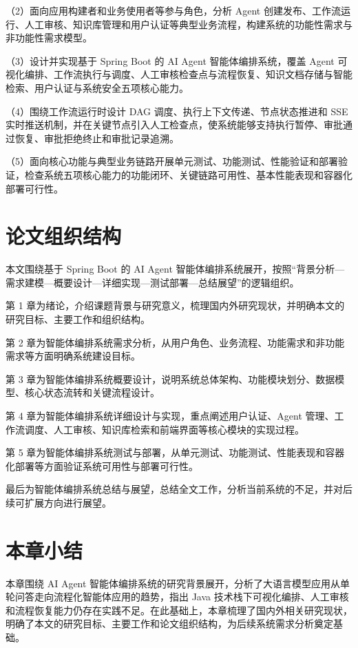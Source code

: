 （2）面向应用构建者和业务使用者等参与角色，分析 Agent 创建发布、工作流运行、人工审核、知识库管理和用户认证等典型业务流程，构建系统的功能性需求与非功能性需求模型。

（3）设计并实现基于 Spring Boot 的 AI Agent 智能体编排系统，覆盖 Agent 可视化编排、工作流执行与调度、人工审核检查点与流程恢复、知识文档存储与智能检索、用户认证与系统安全五项核心能力。

（4）围绕工作流运行时设计 DAG 调度、执行上下文传递、节点状态推进和 SSE 实时推送机制，并在关键节点引入人工检查点，使系统能够支持执行暂停、审批通过恢复、审批拒绝终止和审批记录追溯。

（5）面向核心功能与典型业务链路开展单元测试、功能测试、性能验证和部署验证，检查系统五项核心能力的功能闭环、关键链路可用性、基本性能表现和容器化部署可行性。

\section{论文组织结构}

本文围绕基于 Spring Boot 的 AI Agent 智能体编排系统展开，按照“背景分析—需求建模—概要设计—详细实现—测试部署—总结展望”的逻辑组织。

第 1 章为绪论，介绍课题背景与研究意义，梳理国内外研究现状，并明确本文的研究目标、主要工作和组织结构。

第 2 章为智能体编排系统需求分析，从用户角色、业务流程、功能需求和非功能需求等方面明确系统建设目标。

第 3 章为智能体编排系统概要设计，说明系统总体架构、功能模块划分、数据模型、核心状态流转和关键流程设计。

第 4 章为智能体编排系统详细设计与实现，重点阐述用户认证、Agent 管理、工作流调度、人工审核、知识库检索和前端界面等核心模块的实现过程。

第 5 章为智能体编排系统测试与部署，从单元测试、功能测试、性能表现和容器化部署等方面验证系统可用性与部署可行性。

最后为智能体编排系统总结与展望，总结全文工作，分析当前系统的不足，并对后续可扩展方向进行展望。

\section{本章小结}

本章围绕 AI Agent 智能体编排系统的研究背景展开，分析了大语言模型应用从单轮问答走向流程化智能体应用的趋势，指出 Java 技术栈下可视化编排、人工审核和流程恢复能力仍存在实践不足。在此基础上，本章梳理了国内外相关研究现状，明确了本文的研究目标、主要工作和论文组织结构，为后续系统需求分析奠定基础。

